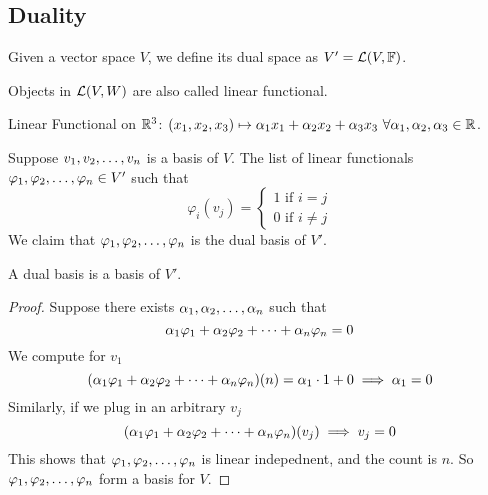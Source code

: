 \subsection{Duality}
\begin{definition}
    Given a vector space $V$, we define its dual space as $V' = \mathcal L(V,\mathbb F)$. 
\end{definition}
\begin{remark}
    Objects in $\mathcal L(V,W)$ are also called linear functional.
\end{remark}
\begin{example}
    Linear Functional on $\mathbb R^3$: $(x_1, x_2, x_3) \mapsto \alpha_1 x_1 + \alpha_2 x_2 + \alpha_3 x_3 \ \forall \alpha_1, \alpha_2, \alpha_3 \in \mathbb R$.
\end{example}
\begin{definition}
    Suppose ${v}_1,{v}_2, \ldots, {v}_{n}$ is a basis of $V$. The list of linear functionals ${\varphi}_1,{\varphi}_2, \ldots, {\varphi}_{n} \in  V'$ such that \[\varphi_i(v_j) = \left\{ \begin{array}{cc}
         1 \text{ if } i = j \\
         0 \text{ if } i \neq j
    \end{array} \right.\] We claim that ${\varphi}_1,{\varphi}_2, \ldots, {\varphi}_{n}$ is the dual basis of $V'$.
\end{definition}
\begin{lemma}
    A dual basis is a basis of $V'$.
\end{lemma}
\begin{proof}
    Suppose there exists ${\alpha}_1,{\alpha}_2, \ldots, {\alpha}_{n}$ such that 
    \[ {\alpha}_1{\varphi}_1 + {\alpha}_2{\varphi}_2 + \cdots + {\alpha}_{n}{\varphi}_{n} = 0\]
    We compute for $v_1$
    \[ ({\alpha}_1{\varphi}_1 + {\alpha}_2{\varphi}_2 + \cdots + {\alpha}_{n}{\varphi}_{n})(n) = \alpha_1 \cdot 1 + 0 \implies \alpha_1 = 0\]
    Similarly, if we plug in an arbitrary $v_j$
    \[ ({\alpha}_1{\varphi}_1 + {\alpha}_2{\varphi}_2 + \cdots + {\alpha}_{n}{\varphi}_{n})(v_j) \implies v_j = 0\]
    This shows that ${\varphi}_1,{\varphi}_2, \ldots, {\varphi}_{n}$ is linear indepednent, and the count is $n$. So ${\varphi}_1,{\varphi}_2, \ldots, {\varphi}_{n}$ form a basis for $V$.
\end{proof}
